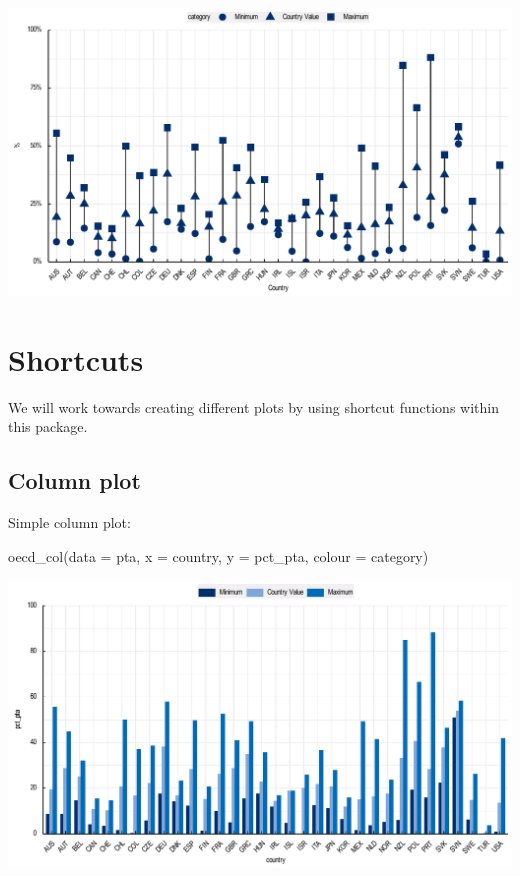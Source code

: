 \documentclass[
  11pt,
  oneside]{report}
\newenvironment{Shaded}{\begin{snugshade}}{\end{snugshade}}
\newcommand{\AttributeTok}[1]{\textcolor[rgb]{0.77,0.63,0.00}{#1}}
\newcommand{\FunctionTok}[1]{\textcolor[rgb]{0.00,0.00,0.00}{#1}}
\newcommand{\NormalTok}[1]{#1}
\begin{document}
\begin{center}\includegraphics{book_figures/maxmin_4-1} \end{center}

\hypertarget{shortcuts}{%
\chapter{Shortcuts}\label{shortcuts}}

We will work towards creating different plots by using shortcut
functions within this package.

\hypertarget{column-plot}{%
\section{Column plot}\label{column-plot}}

Simple column plot:

\begin{Shaded}
\begin{Highlighting}[]
\FunctionTok{oecd\_col}\NormalTok{(}\AttributeTok{data =}\NormalTok{ pta, }\AttributeTok{x =}\NormalTok{ country, }\AttributeTok{y =}\NormalTok{ pct\_pta,  }\AttributeTok{colour =}\NormalTok{ category)}
\end{Highlighting}
\end{Shaded}

\begin{center}\includegraphics{book_figures/sc1-1} \end{center}
\end{document}
